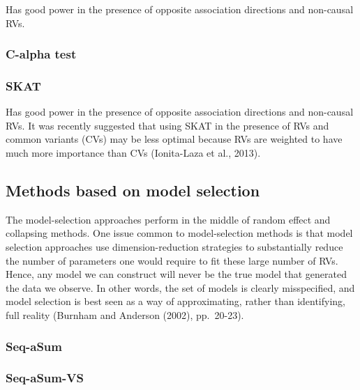 \documentclass[]{book}
\theoremstyle{definition}
\theoremstyle{definition}
\theoremstyle{definition}
\theoremstyle{remark}
\begin{document}
Has good power in the presence of opposite association directions and
non-causal RVs.

\subsubsection{C-alpha test}\label{c-alpha-test}

\subsubsection{SKAT}\label{skat}

Has good power in the presence of opposite association directions and
non-causal RVs. It was recently suggested that using SKAT in the
presence of RVs and common variants (CVs) may be less optimal because
RVs are weighted to have much more importance than CVs (Ionita-Laza et
al., 2013).

\subsection{Methods based on model
selection}\label{methods-based-on-model-selection}

The model-selection approaches perform in the middle of random eﬀect and
collapsing methods. One issue common to model-selection methods is that
model selection approaches use dimension-reduction strategies to
substantially reduce the number of parameters one would require to ﬁt
these large number of RVs. Hence, any model we can construct will never
be the true model that generated the data we observe. In other words,
the set of models is clearly misspeciﬁed, and model selection is best
seen as a way of approximating, rather than identifying, full reality
(Burnham and Anderson (2002), pp.~20-23).

\subsubsection{Seq-aSum}\label{seq-asum}

\subsubsection{Seq-aSum-VS}\label{seq-asum-vs}
\end{document}
